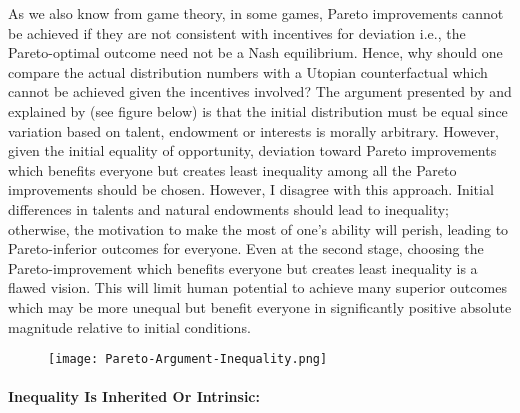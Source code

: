 \documentclass[12pt]{article}
\newcommand{\1}{\mathbbm 1}
\begin{document}
	    As we also know from game theory, in some games, Pareto improvements cannot be achieved if they are not consistent with incentives for deviation i.e., the Pareto-optimal outcome need not be a Nash equilibrium. Hence, why should one compare the actual distribution numbers with a Utopian counterfactual which cannot be achieved given the incentives involved? The argument presented by \cite{rawlstheory1971} and explained by \cite{fisher2011pareto} (see figure below) is that the initial distribution must be equal since variation based on talent, endowment or interests is morally arbitrary. However, given the initial equality of opportunity, deviation toward Pareto improvements which benefits everyone but creates least inequality among all the Pareto improvements should be chosen. However, I disagree with this approach. Initial differences in talents and natural endowments should lead to inequality; otherwise, the motivation to make the most of one's ability will perish, leading to Pareto-inferior outcomes for everyone. Even at the second stage, choosing the Pareto-improvement which benefits everyone but creates least inequality is a flawed vision. This will limit human potential to achieve many superior outcomes which may be more unequal but benefit everyone in significantly positive absolute magnitude relative to initial conditions.
	    
	    
	    	\begin{figure}[H]
	    	\begin{center}
	    			\texttt{[image: Pareto-Argument-Inequality.png]}%
	    			\label{fig:a}%
	    	\end{center}
	    	\caption{\cite{fisher2011pareto}}
	    \end{figure}
	    
	    
	    
	    
	    
	    
	    \paragraph{Inequality Is Inherited Or Intrinsic:}
	    
\end{document}
